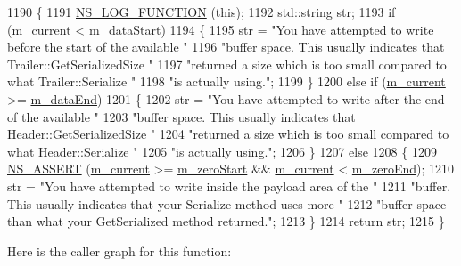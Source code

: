 \begin{DoxyCode}
1190 \{
1191   \hyperlink{log-macros-disabled_8h_a90b90d5bad1f39cb1b64923ea94c0761}{NS\_LOG\_FUNCTION} (\textcolor{keyword}{this});
1192   std::string str;
1193   \textcolor{keywordflow}{if} (\hyperlink{classns3_1_1Buffer_1_1Iterator_a762e0242d60f4d717158d0584e4accd6}{m\_current} < \hyperlink{classns3_1_1Buffer_1_1Iterator_a32761e12a581576dc0567d5018b59e49}{m\_dataStart})
1194     \{
1195       str = \textcolor{stringliteral}{"You have attempted to write before the start of the available "}
1196         \textcolor{stringliteral}{"buffer space. This usually indicates that Trailer::GetSerializedSize "}
1197         \textcolor{stringliteral}{"returned a size which is too small compared to what Trailer::Serialize "}
1198         \textcolor{stringliteral}{"is actually using."};
1199     \}
1200   \textcolor{keywordflow}{else} \textcolor{keywordflow}{if} (\hyperlink{classns3_1_1Buffer_1_1Iterator_a762e0242d60f4d717158d0584e4accd6}{m\_current} >= \hyperlink{classns3_1_1Buffer_1_1Iterator_a0c6c677b1bbb7ee98a99dd7f40b495b8}{m\_dataEnd})
1201     \{
1202       str = \textcolor{stringliteral}{"You have attempted to write after the end of the available "}
1203         \textcolor{stringliteral}{"buffer space. This usually indicates that Header::GetSerializedSize "}
1204         \textcolor{stringliteral}{"returned a size which is too small compared to what Header::Serialize "}
1205         \textcolor{stringliteral}{"is actually using."};
1206     \}
1207   \textcolor{keywordflow}{else}
1208     \{
1209       \hyperlink{assert_8h_a6dccdb0de9b252f60088ce281c49d052}{NS\_ASSERT} (\hyperlink{classns3_1_1Buffer_1_1Iterator_a762e0242d60f4d717158d0584e4accd6}{m\_current} >= \hyperlink{classns3_1_1Buffer_1_1Iterator_aa1d37de1fc02ff0bf9efde8ea6ee5097}{m\_zeroStart} && 
      \hyperlink{classns3_1_1Buffer_1_1Iterator_a762e0242d60f4d717158d0584e4accd6}{m\_current} < \hyperlink{classns3_1_1Buffer_1_1Iterator_a556e752ebfc82c2704fae79ce36aec6f}{m\_zeroEnd});
1210       str = \textcolor{stringliteral}{"You have attempted to write inside the payload area of the "}
1211         \textcolor{stringliteral}{"buffer. This usually indicates that your Serialize method uses more "}
1212         \textcolor{stringliteral}{"buffer space than what your GetSerialized method returned."};
1213     \}
1214   \textcolor{keywordflow}{return} str;
1215 \}
\end{DoxyCode}


Here is the caller graph for this function\+:


